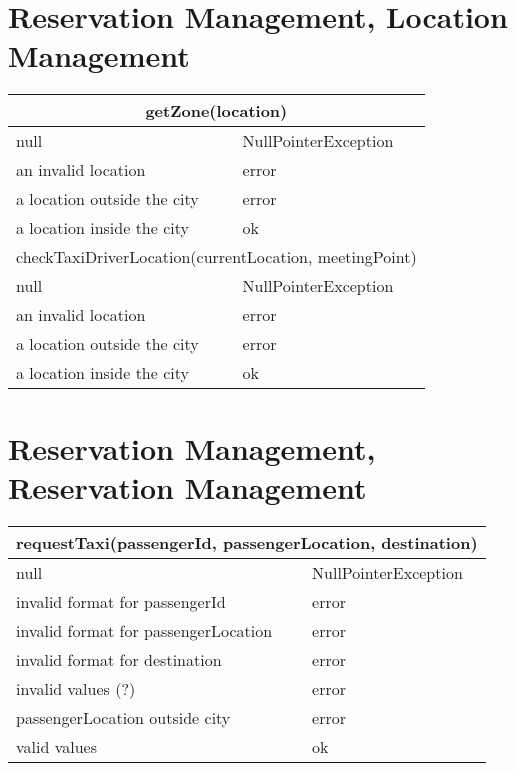 \documentclass[11pt,oneside,a4paper]{report}
\begin{document}
\section{Reservation Management, Location Management}
\begin{tabular}{p{5cm}|p{6cm}}
\hline
	\multicolumn{2}{c}{getZone(location)}\\\hline
	null &
	NullPointerException \\\hline
	an invalid location &
	error \\\hline
	a location outside the city &
	error \\\hline
	a location inside the city &
	ok \\\hline\hline
		
	\multicolumn{2}{c}{	checkTaxiDriverLocation(currentLocation, meetingPoint)}\\\hline
	null &
	NullPointerException \\\hline
	an invalid location &
	error \\\hline
	a location outside the city &
	error \\\hline
	a location inside the city &
	ok \\\hline
\end{tabular}


\section{Reservation Management, Reservation Management}
\begin{tabular}{p{5cm}|p{6cm}}
\hline
	\multicolumn{2}{c}{requestTaxi(passengerId, passengerLocation, destination)}\\\hline
	null &
	NullPointerException \\\hline
	invalid format for passengerId &
	error \\\hline
	invalid format for passengerLocation &
	error \\\hline
	invalid format for destination &
	error \\\hline
	invalid values (?) &
	error \\\hline
	passengerLocation outside city &
	error \\\hline
	valid values &
	ok \\\hline\hline
\end{tabular}
\end{document}
